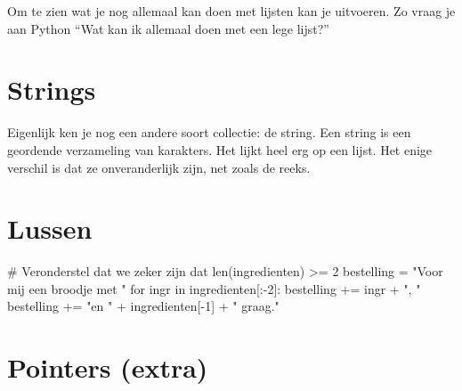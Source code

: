   Om te zien wat je nog allemaal kan doen met lijsten kan je 
  uitvoeren. Zo vraag je aan Python ``Wat kan ik allemaal doen met een lege
  lijst?''

\section{Strings}
  Eigenlijk ken je nog een andere soort collectie: de string. Een string is een
  geordende verzameling van karakters. Het lijkt heel erg op een lijst. Het
  enige verschil is dat ze onveranderlijk zijn, net zoals de reeks.


\section{Lussen}
  \begin{python}
    # Veronderstel dat we zeker zijn dat len(ingredienten) >= 2
    bestelling = "Voor mij een broodje met "
    for ingr in ingredienten[:-2]:
      bestelling += ingr + ", "
    bestelling += "en " + ingredienten[-1] + " graag."
  \end{python}


\section{Pointers (extra)}\label{sec:pointers}
